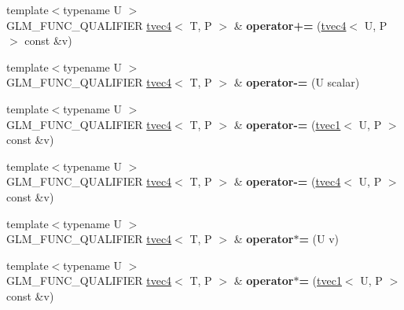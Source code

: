 \begin{DoxyCompactItemize}
\item 
\hypertarget{structglm_1_1tvec4_a7f4b03466df6bcba831d4cfac6df8405}{{\footnotesize template$<$typename U $>$ }\\G\-L\-M\-\_\-\-F\-U\-N\-C\-\_\-\-Q\-U\-A\-L\-I\-F\-I\-E\-R \hyperlink{structglm_1_1tvec4}{tvec4}$<$ T, P $>$ \& {\bfseries operator+=} (\hyperlink{structglm_1_1tvec4}{tvec4}$<$ U, P $>$ const \&v)}\label{structglm_1_1tvec4_a7f4b03466df6bcba831d4cfac6df8405}

\item 
\hypertarget{structglm_1_1tvec4_aa293b1a9e9bfc9d9a3700a821a39cc23}{{\footnotesize template$<$typename U $>$ }\\G\-L\-M\-\_\-\-F\-U\-N\-C\-\_\-\-Q\-U\-A\-L\-I\-F\-I\-E\-R \hyperlink{structglm_1_1tvec4}{tvec4}$<$ T, P $>$ \& {\bfseries operator-\/=} (U scalar)}\label{structglm_1_1tvec4_aa293b1a9e9bfc9d9a3700a821a39cc23}

\item 
\hypertarget{structglm_1_1tvec4_a1cb06bb90bd33c7cf2c8a2a97484af56}{{\footnotesize template$<$typename U $>$ }\\G\-L\-M\-\_\-\-F\-U\-N\-C\-\_\-\-Q\-U\-A\-L\-I\-F\-I\-E\-R \hyperlink{structglm_1_1tvec4}{tvec4}$<$ T, P $>$ \& {\bfseries operator-\/=} (\hyperlink{structglm_1_1tvec1}{tvec1}$<$ U, P $>$ const \&v)}\label{structglm_1_1tvec4_a1cb06bb90bd33c7cf2c8a2a97484af56}

\item 
\hypertarget{structglm_1_1tvec4_a75d65a025aeea5e7351d8c0113fabebb}{{\footnotesize template$<$typename U $>$ }\\G\-L\-M\-\_\-\-F\-U\-N\-C\-\_\-\-Q\-U\-A\-L\-I\-F\-I\-E\-R \hyperlink{structglm_1_1tvec4}{tvec4}$<$ T, P $>$ \& {\bfseries operator-\/=} (\hyperlink{structglm_1_1tvec4}{tvec4}$<$ U, P $>$ const \&v)}\label{structglm_1_1tvec4_a75d65a025aeea5e7351d8c0113fabebb}

\item 
\hypertarget{structglm_1_1tvec4_a33044c2bf093543664dc42f82a90a267}{{\footnotesize template$<$typename U $>$ }\\G\-L\-M\-\_\-\-F\-U\-N\-C\-\_\-\-Q\-U\-A\-L\-I\-F\-I\-E\-R \hyperlink{structglm_1_1tvec4}{tvec4}$<$ T, P $>$ \& {\bfseries operator$\ast$=} (U v)}\label{structglm_1_1tvec4_a33044c2bf093543664dc42f82a90a267}

\item 
\hypertarget{structglm_1_1tvec4_ab88c27f3115f0fa7593fccf3d896779b}{{\footnotesize template$<$typename U $>$ }\\G\-L\-M\-\_\-\-F\-U\-N\-C\-\_\-\-Q\-U\-A\-L\-I\-F\-I\-E\-R \hyperlink{structglm_1_1tvec4}{tvec4}$<$ T, P $>$ \& {\bfseries operator$\ast$=} (\hyperlink{structglm_1_1tvec1}{tvec1}$<$ U, P $>$ const \&v)}\label{structglm_1_1tvec4_ab88c27f3115f0fa7593fccf3d896779b}


\end{DoxyCompactItemize}
